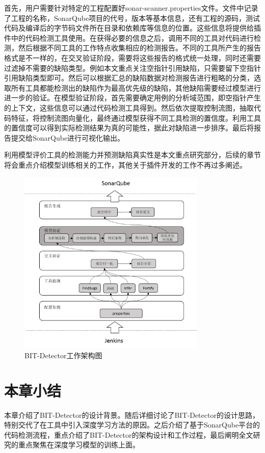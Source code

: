 首先，用户需要针对特定的工程配置好sonar-scanner.properties文件。文件中记录了工程的名称，SonarQube项目的代号，版本等基本信息，还有工程的源码，测试代码及编译后的字节码文件所在目录和依赖库等信息的位置。这些信息将提供给插件中的代码检测工具使用。在获得必要的信息之后，调用不同的工具对代码进行检测，然后根据不同工具的工作特点收集相应的检测报告。不同的工具所产生的报告格式是不一样的，在交叉验证阶段，需要将这些报告的格式统一处理，同时还需要过滤掉不需要的缺陷类型。例如本文重点关注空指针引用缺陷，只需要留下空指针引用缺陷类型即可。然后可以根据汇总的缺陷数据对检测报告进行粗略的分类，选取所有工具都能检测出的缺陷作为最高优先级的缺陷，其他缺陷需要经过模型进行进一步的验证。在模型验证阶段，首先需要确定用例的分析域范围，即空指针产生的上下文，这些信息可以通过代码检测工具得到。然后依次提取控制流图，抽取代码特征，将控制流图向量化，最终通过模型获得不同工具检测的置信度。利用工具的置信度可以得到实际检测结果为真的可能性，据此对缺陷进一步排序。最后将报告提交给SonarQube进行可视化输出。

利用模型评价工具的检测能力并预测缺陷真实性是本文重点研究部分，后续的章节将会重点介绍模型训练相关的工作，其他关于插件开发的工作不再过多阐述。


\begin{figure}
	\centering
	\includegraphics[width=0.80\textwidth]{figures/BITDetector3-3}
	\caption{BIT-Detector工作架构图}\label{fig:figure3-3}
\end{figure}

\section{本章小结}

本章介绍了BIT-Detector的设计背景。随后详细讨论了BIT-Detector的设计思路，特别交代了在工具中引入深度学习方法的原因。之后介绍了基于SonarQube平台的代码检测流程，重点介绍了BIT-Detector的架构设计和工作过程，最后阐明全文研究的重点聚焦在深度学习模型的训练上面。
